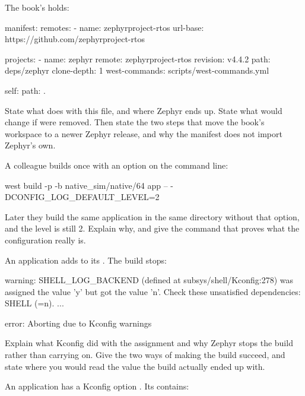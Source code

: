  The book's  holds:

\begin{yamlcode}
manifest:
  remotes:
    - name: zephyrproject-rtos
      url-base: https://github.com/zephyrproject-rtos

  projects:
    - name: zephyr
      remote: zephyrproject-rtos
      revision: v4.4.2
      path: deps/zephyr
      clone-depth: 1
      west-commands: scripts/west-commands.yml

  self:
    path: .
\end{yamlcode}

\noindent State what  does with this file, and where Zephyr ends up. State what
would change if  were removed. Then state the two steps that move the book's
workspace to a newer Zephyr release, and why the manifest does not import Zephyr's own. 

 A colleague builds once with an option on the command line:

\begin{shell}
west build -p -b native_sim/native/64 app -- -DCONFIG_LOG_DEFAULT_LEVEL=2
\end{shell}

\noindent Later they build the same application in the same directory without that option, and the
level is still 2. Explain why, and give the command that proves what the configuration really is.

\label{exa:q:2}

 An application adds  to its . The build
stops:

\begin{console}
warning: SHELL_LOG_BACKEND (defined at subsys/shell/Kconfig:278) was assigned the value 'y' but got
the value 'n'. Check these unsatisfied dependencies: SHELL (=n). ...

error: Aborting due to Kconfig warnings
\end{console}

\noindent Explain what Kconfig did with the assignment and why Zephyr stops the build rather than
carrying on. Give the two ways of making the build succeed, and state where you would read the value
the build actually ended up with. 

 An application has a Kconfig option . Its  contains:

